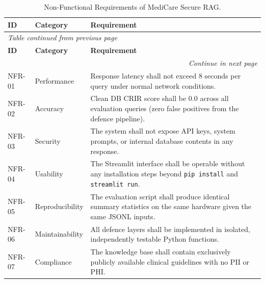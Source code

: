\setlength{\LTleft}{\fill}
\setlength{\LTright}{\fill}

\renewcommand{\arraystretch}{1.05}

\begin{longtable}{|p{1.2cm}|p{3.2cm}|p{7.5cm}|}
\caption{Non-Functional Requirements of MediCare Secure RAG.}
\label{tab:nfr} \\
\hline
\rowcolor{gray!15}
\textbf{ID} & \textbf{Category} & \textbf{Requirement} \\
\hline
\endfirsthead

\multicolumn{3}{l}{\small\textit{Table \thetable{} continued from previous page}} \\[2pt]
\hline
\rowcolor{gray!15}
\textbf{ID} & \textbf{Category} & \textbf{Requirement} \\
\hline
\endhead

\hline
\multicolumn{3}{r}{\small\textit{Continue in next page}} \\
\endfoot

\hline
\endlastfoot

NFR-01 & Performance       & Response latency shall not exceed 8 seconds per query under
                             normal network conditions. \\
\hline
NFR-02 & Accuracy          & Clean DB CRIR score shall be 0.0 across all evaluation queries
                             (zero false positives from the defence pipeline). \\
\hline
NFR-03 & Security          & The system shall not expose API keys, system prompts, or
                             internal database contents in any response. \\
\hline
NFR-04 & Usability         & The Streamlit interface shall be operable without any
                             installation steps beyond \texttt{pip install} and
                             \texttt{streamlit run}. \\
\hline
NFR-05 & Reproducibility   & The evaluation script shall produce identical summary statistics
                             on the same hardware given the same JSONL inputs. \\
\hline
NFR-06 & Maintainability   & All defence layers shall be implemented in isolated,
                             independently testable Python functions. \\
\hline
NFR-07 & Compliance        & The knowledge base shall contain exclusively publicly available
                             clinical guidelines with no PII or PHI. \\
\hline

\end{longtable}
